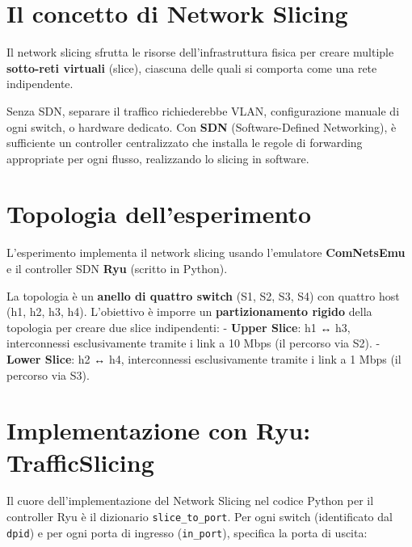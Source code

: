 \documentclass[
  italian,
  openany]{book}
\begin{document}
\section{Il concetto di Network
Slicing}\label{il-concetto-di-network-slicing}

Il network slicing sfrutta le risorse dell'infrastruttura fisica per
creare multiple \textbf{sotto-reti virtuali} (slice), ciascuna delle
quali si comporta come una rete indipendente.

Senza SDN, separare il traffico richiederebbe VLAN, configurazione
manuale di ogni switch, o hardware dedicato. Con \textbf{SDN}
(Software-Defined Networking), è sufficiente un controller centralizzato
che installa le regole di forwarding appropriate per ogni flusso,
realizzando lo slicing in software.

\section{Topologia dell'esperimento}\label{topologia-dellesperimento}

L'esperimento implementa il network slicing usando l'emulatore
\textbf{ComNetsEmu} e il controller SDN \textbf{Ryu} (scritto in
Python).

La topologia è un \textbf{anello di quattro switch} (S1, S2, S3, S4) con
quattro host (h1, h2, h3, h4). L'obiettivo è imporre un
\textbf{partizionamento rigido} della topologia per creare due slice
indipendenti: - \textbf{Upper Slice}: h1 ↔ h3, interconnessi
esclusivamente tramite i link a 10 Mbps (il percorso via S2). -
\textbf{Lower Slice}: h2 ↔ h4, interconnessi esclusivamente tramite i
link a 1 Mbps (il percorso via S3).

\section{Implementazione con Ryu:
TrafficSlicing}\label{implementazione-con-ryu-trafficslicing}

Il cuore dell'implementazione del Network Slicing nel codice Python per
il controller Ryu è il dizionario \texttt{slice\_to\_port}. Per ogni
switch (identificato dal \texttt{dpid}) e per ogni porta di ingresso
(\texttt{in\_port}), specifica la porta di uscita:
\end{document}
